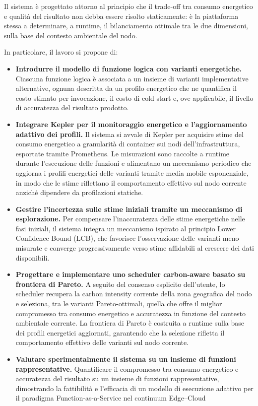 Il sistema è progettato attorno al principio che il trade-off tra consumo energetico e
qualità del risultato non debba essere risolto staticamente: è la piattaforma stessa a determinare, a
runtime, il bilanciamento ottimale tra le due dimensioni, sulla base del contesto
ambientale del nodo.

In particolare, il lavoro si propone di:

\begin{itemize}

  \item \textbf{Introdurre il modello di funzione logica con varianti energetiche.}
  Ciascuna funzione logica è associata a un insieme di varianti implementative
  alternative, ognuna descritta da un profilo energetico che ne quantifica il costo
  stimato per invocazione, il costo di cold start e, ove applicabile, il livello di
  accuratezza del risultato prodotto.

  \item \textbf{Integrare Kepler per il monitoraggio energetico e l'aggiornamento adattivo dei profili.}
  Il sistema si avvale di Kepler per acquisire stime del consumo energetico 
  a granularità di container sui nodi dell'infrastruttura,
  esportate tramite Prometheus. 
  Le misurazioni sono raccolte a runtime durante l'esecuzione delle funzioni e 
  alimentano un meccanismo periodico che aggiorna i profili energetici delle varianti tramite media mobile esponenziale, in modo che le stime riflettano 
  il comportamento effettivo sul nodo corrente anziché dipendere da profilazioni statiche.
 
  \item \textbf{Gestire l'incertezza sulle stime iniziali tramite un meccanismo di
  esplorazione.}
  Per compensare l'inaccuratezza delle stime energetiche nelle fasi iniziali, il
  sistema integra un meccanismo ispirato al principio Lower Confidence Bound
  (LCB), che favorisce l'osservazione delle varianti meno misurate e converge
  progressivamente verso stime affidabili al crescere dei dati disponibili.

  \item \textbf{Progettare e implementare uno scheduler carbon-aware basato su frontiera
  di Pareto.}
  A seguito del consenso esplicito dell'utente, 
  lo scheduler recupera la carbon intensity corrente della zona geografica del nodo 
  e seleziona, tra le varianti Pareto-ottimali, quella che offre il miglior compromesso 
  tra consumo energetico e accuratezza in funzione del contesto ambientale corrente. 
  La frontiera di Pareto è costruita a runtime sulla base dei profili energetici 
  aggiornati, garantendo che la selezione rifletta il comportamento effettivo delle 
  varianti sul nodo corrente.

  \item \textbf{Valutare sperimentalmente il sistema su un insieme di funzioni
  rappresentative.}
  Quantificare il compromesso tra consumo energetico e accuratezza
    del risultato su un insieme di funzioni rappresentative, dimostrando la fattibilità
    e l'efficacia di un modello di esecuzione adattivo per il paradigma Function-as-a-Service nel continuum Edge–Cloud
\end{itemize}

